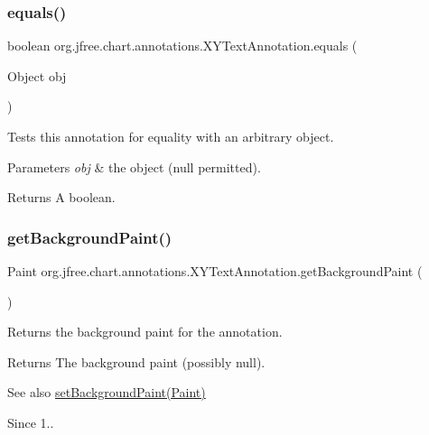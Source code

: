 \subsubsection{\texorpdfstring{equals()}{equals()}}
{\footnotesize\ttfamily boolean org.\+jfree.\+chart.\+annotations.\+X\+Y\+Text\+Annotation.\+equals (\begin{DoxyParamCaption}\item[{Object}]{obj }\end{DoxyParamCaption})}

Tests this annotation for equality with an arbitrary object.


\begin{DoxyParams}{Parameters}
{\em obj} & the object ({\ttfamily null} permitted).\\
\hline
\end{DoxyParams}
\begin{DoxyReturn}{Returns}
A boolean. 
\end{DoxyReturn}
\mbox{\label{classorg_1_1jfree_1_1chart_1_1annotations_1_1_x_y_text_annotation_a2b5d533237dd21f1fd5fe402c88efa80}} 
\subsubsection{\texorpdfstring{get\+Background\+Paint()}{getBackgroundPaint()}}
{\footnotesize\ttfamily Paint org.\+jfree.\+chart.\+annotations.\+X\+Y\+Text\+Annotation.\+get\+Background\+Paint (\begin{DoxyParamCaption}{ }\end{DoxyParamCaption})}

Returns the background paint for the annotation.

\begin{DoxyReturn}{Returns}
The background paint (possibly {\ttfamily null}).
\end{DoxyReturn}
\begin{DoxySeeAlso}{See also}
\mbox{\hyperlink{classorg_1_1jfree_1_1chart_1_1annotations_1_1_x_y_text_annotation_a541d1f0761326c21a156b6ecb5bad25f}{set\+Background\+Paint(\+Paint)}}
\end{DoxySeeAlso}
\begin{DoxySince}{Since}
1.. 
\end{DoxySince}
\mbox{\label{classorg_1_1jfree_1_1chart_1_1annotations_1_1_x_y_text_annotation_a5db5176b7e4eca80d7d54179953d5250}} 
